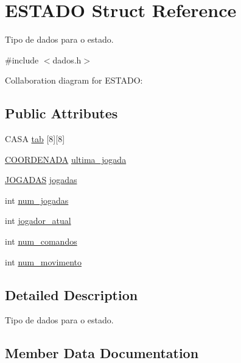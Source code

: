 \hypertarget{structESTADO}{}\section{E\+S\+T\+A\+DO Struct Reference}
\label{structESTADO}


Tipo de dados para o estado.  




{\ttfamily \#include $<$dados.\+h$>$}



Collaboration diagram for E\+S\+T\+A\+DO\+:
\subsection*{Public Attributes}
\begin{DoxyCompactItemize}
\item 
C\+A\+SA \hyperlink{structESTADO_ab56f0f1be16954d3768b4174d14c087d}{tab} \mbox{[}8\mbox{]}\mbox{[}8\mbox{]}
\item 
\hyperlink{structCOORDENADA}{C\+O\+O\+R\+D\+E\+N\+A\+DA} \hyperlink{structESTADO_a4896a5c5c1f40b43fb795623327e3f47}{ultima\+\_\+jogada}
\item 
\hyperlink{dados_8h_a94c221d29a1760f008b7834093259b7d}{J\+O\+G\+A\+D\+AS} \hyperlink{structESTADO_afae43b87a488fad0f2b56a18bad31d18}{jogadas}
\item 
int \hyperlink{structESTADO_a261495728744647e618b4e623f5a4b7a}{num\+\_\+jogadas}
\item 
int \hyperlink{structESTADO_a5dd28e2e68b7aef2b6b7ea88e02eff58}{jogador\+\_\+atual}
\item 
int \hyperlink{structESTADO_abe6faacdd6111160bf9a354f44b95b38}{num\+\_\+comandos}
\item 
int \hyperlink{structESTADO_a2a04cf6054f85e3dbee5fb8cc08e7264}{num\+\_\+movimento}
\end{DoxyCompactItemize}


\subsection{Detailed Description}
Tipo de dados para o estado. 

\subsection{Member Data Documentation}
\mbox{\label{structESTADO_afae43b87a488fad0f2b56a18bad31d18}} 
